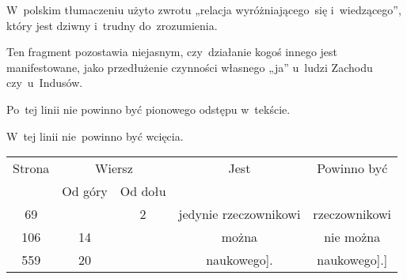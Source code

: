 \documentclass[a4paper,11pt]{article}
\begin{document}
\vspace{\spaceFour}





\noindent
{} W~polskim tłumaczeniu użyto zwrotu „relacja
wyróżniającego~się i~wiedzącego”, który jest dziwny i~trudny
do~zrozumienia.

\vspace{\spaceFour}





\noindent
{} Ten fragment pozostawia niejasnym,
czy~działanie kogoś innego jest manifestowane, jako przedłużenie
czynności własnego „ja” u~ludzi Zachodu czy~u~Indusów.

\vspace{\spaceFour}





\noindent
{} Po~tej linii nie powinno być pionowego odstępu w~tekście.

\vspace{\spaceFour}





\noindent
{} W~tej linii nie~powinno być wcięcia.





\newpage



\begin{center}

  \begin{tabular}{|c|c|c|c|c|}
    \hline
    Strona & \multicolumn{2}{c|}{Wiersz} & Jest
                              & Powinno być \\ \cline{2-3}
    & Od góry & Od dołu & & \\
    \hline
    69  & &  2 & jedynie rzeczownikowi & rzeczownikowi \\
    106 & 14 & & można & nie można \\
    559 & 20 & & naukowego]. & naukowego].] \\
    \hline
  \end{tabular}

\end{center}
\end{document}
